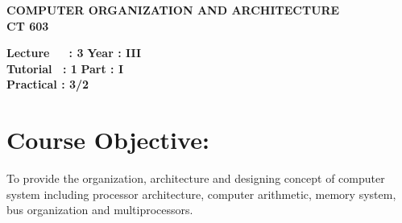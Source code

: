 \begin{center}
    \textbf{\huge{\uppercase{Computer Organization and Architecture}}}
    \\
    \vspace{.5cm}
    \textbf{\large{CT 603}}
\end{center}

\noindent\textbf{Lecture\ \ \ : 3} \hfill \textbf{Year : III} \\
\textbf{Tutorial \ : 1} \hfill \textbf{Part : I } \\
\textbf{Practical : 3/2}  \\

\par
\noindent 
\section*{Course Objective:}
To provide the organization, architecture and designing concept of computer system including processor architecture, computer arithmetic, memory system, bus organization and multiprocessors.


